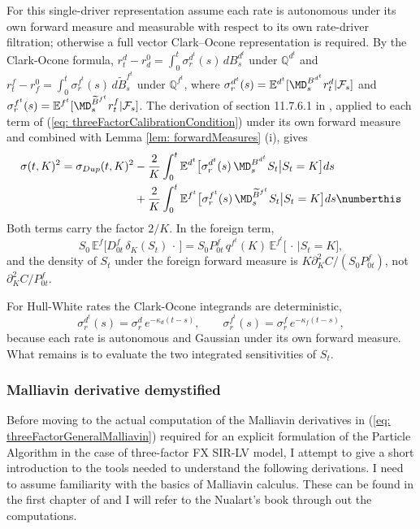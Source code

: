 For this single-driver representation assume each rate is autonomous under its own forward measure and measurable with respect to its own rate-driver filtration; otherwise a full vector Clark--Ocone representation is required. By the Clark-Ocone formula, $r^d_t-r^0_d=\int_0^t\sigma^{d^t}_r(s)\,dB^{d^t}_s$ under $\mathbb{Q}^{d^t}$ and $r^f_t-r^0_f=\int_0^t\sigma^{f^t}_r(s)\,d\widetilde{B}^{f^t}_s$ under $\mathbb{Q}^{f^t}$, where $\sigma^{d^t}_r(s)=\mathbb{E}^{d^t}[\MD^{B^{d^t}}_sr^d_t|\mathcal{F}_s]$ and $\sigma^{f^t}_r(s)=\mathbb{E}^{f^t}[\MD^{\widetilde{B}^{f^t}}_sr^f_t|\mathcal{F}_s]$. The derivation of section 11.7.6.1 in \cite{guyonLabordere}, applied to each term of (\ref{eq: threeFactorCalibrationCondition}) under its own forward measure and combined with Lemma \ref{lem: forwardMeasures} (i), gives
\begin{align*}
\sigma(t,K)^2 = \sigma_{Dup}(t,K)^2 & - \frac{2}{K}\int _0^t \mathbb{E}^{d^t}\big[\sigma_r^{d^t}(s)\, \MD _s^{B^{d^t}}S_t  \big|S_t = K \big]ds \\
& +  \frac{2}{K}\int _0^t \mathbb{E}^{f^t}\big[\sigma_r^{f^t}(s)\, \MD _s^{\widetilde{B}^{f^t}}S_t  \big|S_t = K \big]ds
\numberthis \label{eq: threeFactorGeneralMalliavin}
\end{align*}
Both terms carry the factor $2/K$. In the foreign term,
$$S_0\,\mathbb{E}^f\big[D^f_{0t}\,\delta_K(S_t)\,\cdot\,\big]=S_0P^f_{0t}\,q^{f^t}(K)\,\mathbb{E}^{f^t}\big[\,\cdot\,\big|S_t=K\big],$$
and the density of $S_t$ under the foreign forward measure is $K\partial_K^2C/(S_0P^f_{0t})$, not $\partial^2_KC/P^f_{0t}$.

For Hull-White rates the Clark-Ocone integrands are deterministic,
\begin{equation}\label{eq: kernels}
\sigma_r^{d^t}(s)=\sigma^d_r\,e^{-\kappa_d(t-s)},\qquad \sigma_r^{f^t}(s)=\sigma^f_r\,e^{-\kappa_f(t-s)},
\end{equation}
because each rate is autonomous and Gaussian under its own forward measure. What remains is to evaluate the two integrated sensitivities of $S_t$.

\subsubsection{Malliavin derivative demystified}
Before moving to the actual computation of the Malliavin derivatives in (\ref{eq: threeFactorGeneralMalliavin}) required for an explicit formulation of the Particle Algorithm in the case of three-factor FX SIR-LV model, I attempt to give a short introduction to the tools needed to understand the following derivations.
I need to assume familiarity with the basics of Malliavin calculus. These can be found in the first chapter of \cite{nualart} and I will refer to the Nualart's book through out the computations.

